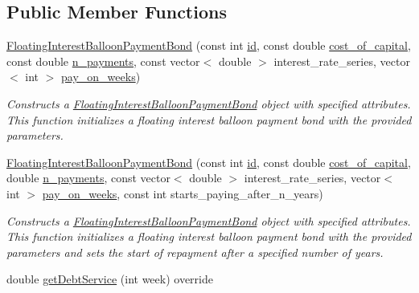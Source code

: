 \subsection*{Public Member Functions}
\begin{DoxyCompactItemize}
\item 
\mbox{\hyperlink{classFloatingInterestBalloonPaymentBond_aa42f50447a3dd1bd6959e8c4bd0c2421}{Floating\+Interest\+Balloon\+Payment\+Bond}} (const int \mbox{\hyperlink{classBond_a7f75bcafbc16676ad6dbafbf40afae4a}{id}}, const double \mbox{\hyperlink{classBond_ad98df7d28b398e620286f95ee085439b}{cost\+\_\+of\+\_\+capital}}, const double \mbox{\hyperlink{classBond_a4a227b6de2eeada118d82ab1633b1db8}{n\+\_\+payments}}, const vector$<$ double $>$ interest\+\_\+rate\+\_\+series, vector$<$ int $>$ \mbox{\hyperlink{classBond_ae8dd46fcbf95c993460ffe4ea1f52739}{pay\+\_\+on\+\_\+weeks}})
\begin{DoxyCompactList}\small\item\em Constructs a \mbox{\hyperlink{classFloatingInterestBalloonPaymentBond}{Floating\+Interest\+Balloon\+Payment\+Bond}} object with specified attributes. This function initializes a floating interest balloon payment bond with the provided parameters. \end{DoxyCompactList}\item 
\mbox{\hyperlink{classFloatingInterestBalloonPaymentBond_a9732cbf82ecc484237071bb681f7dc63}{Floating\+Interest\+Balloon\+Payment\+Bond}} (const int \mbox{\hyperlink{classBond_a7f75bcafbc16676ad6dbafbf40afae4a}{id}}, const double \mbox{\hyperlink{classBond_ad98df7d28b398e620286f95ee085439b}{cost\+\_\+of\+\_\+capital}}, double \mbox{\hyperlink{classBond_a4a227b6de2eeada118d82ab1633b1db8}{n\+\_\+payments}}, const vector$<$ double $>$ interest\+\_\+rate\+\_\+series, vector$<$ int $>$ \mbox{\hyperlink{classBond_ae8dd46fcbf95c993460ffe4ea1f52739}{pay\+\_\+on\+\_\+weeks}}, const int starts\+\_\+paying\+\_\+after\+\_\+n\+\_\+years)
\begin{DoxyCompactList}\small\item\em Constructs a \mbox{\hyperlink{classFloatingInterestBalloonPaymentBond}{Floating\+Interest\+Balloon\+Payment\+Bond}} object with specified attributes. This function initializes a floating interest balloon payment bond with the provided parameters and sets the start of repayment after a specified number of years. \end{DoxyCompactList}\item 
double \mbox{\hyperlink{classFloatingInterestBalloonPaymentBond_a0009a0b12e0ebeb15952561513ddc901}{get\+Debt\+Service}} (int week) override

\end{DoxyCompactItemize}
